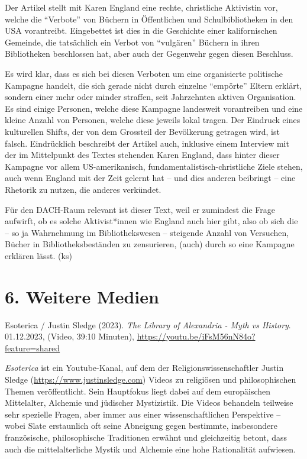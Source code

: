 \documentclass[a4paper,
fontsize=11pt,
oneside,
numbers=noperiodatend,
parskip=half-,
bibliography=totoc,
final
]{scrartcl}
\begin{document}
Der Artikel stellt mit Karen England eine rechte, christliche Aktivistin
vor, welche die \enquote{Verbote} von Büchern in Öffentlichen und
Schulbibliotheken in den USA vorantreibt. Eingebettet ist dies in die
Geschichte einer kalifornischen Gemeinde, die tatsächlich ein Verbot von
\enquote{vulgären} Büchern in ihren Bibliotheken beschlossen hat, aber
auch der Gegenwehr gegen diesen Beschluss.

Es wird klar, dass es sich bei diesen Verboten um eine organisierte
politische Kampagne handelt, die sich gerade nicht durch einzelne
\enquote{empörte} Eltern erklärt, sondern einer mehr oder minder
straffen, seit Jahrzehnten aktiven Organisation. Es sind einige
Personen, welche diese Kampagne landesweit vorantreiben und eine kleine
Anzahl von Personen, welche diese jeweils lokal tragen. Der Eindruck
eines kulturellen Shifts, der von dem Grossteil der Bevölkerung getragen
wird, ist falsch. Eindrücklich beschreibt der Artikel auch, inklusive
einem Interview mit der im Mittelpunkt des Textes stehenden Karen
England, dass hinter dieser Kampagne vor allem US-amerikanisch,
fundamentalistisch-christliche Ziele stehen, auch wenn England mit der
Zeit gelernt hat -- und dies anderen beibringt -- eine Rhetorik zu
nutzen, die anderes verkündet.

Für den DACH-Raum relevant ist dieser Text, weil er zumindest die Frage
aufwirft, ob es solche Aktivist*innen wie England auch hier gibt, also
ob sich die -- so ja Wahrnehmung im Bibliothekswesen -- steigende Anzahl
von Versuchen, Bücher in Bibliotheksbeständen zu zensurieren, (auch)
durch so eine Kampagne erklären lässt. (ks)

\hypertarget{weitere-medien}{%
\section{6. Weitere Medien}\label{weitere-medien}}

Esoterica / Justin Sledge (2023). \emph{The Library of Alexandria - Myth
vs History}. 01.12.2023, (Video, 39:10 Minuten),
\url{https://youtu.be/iFsM56nN84o?feature=shared}

\emph{Esoterica} ist ein Youtube-Kanal, auf dem der
Religionswissenschaftler Justin Sledge
(\url{https://www.justinsledge.com}) Videos zu religiösen und
philosophischen Themen veröffentlicht. Sein Hauptfokus liegt dabei auf
dem europäischen Mittelalter, Alchemie und jüdischer Mystizistik. Die
Videos behandeln teilweise sehr spezielle Fragen, aber immer aus einer
wissenschaftlichen Perspektive -- wobei Slate erstaunlich oft seine
Abneigung gegen bestimmte, insbesondere französische, philosophische
Traditionen erwähnt und gleichzeitig betont, dass auch die
mittelalterliche Mystik und Alchemie eine hohe Rationalität aufwiesen.
\end{document}
